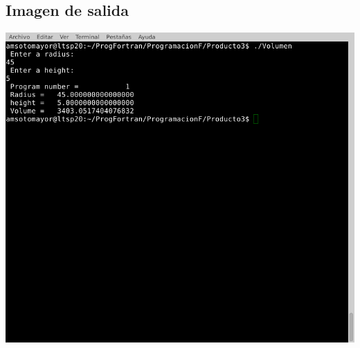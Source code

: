 \documentclass[letterpaper,10pt,twoside,onecolumn]{article}
\begin{document}
\subsection{Imagen de salida}
\includegraphics[scale=.75]{Volumen.png}

\end{document}
